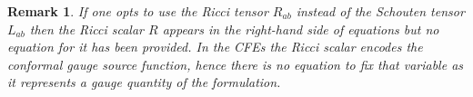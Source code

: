 \documentclass[10pt,a4paper]{article}
\theoremstyle{plain}
\newtheorem{remark}{Remark}
\begin{document}
{ \color{blue}

\begin{remark}
  \emph{ If one opts to use the Ricci tensor $R_{ab}$ instead of the Schouten tensor $L_{ab}$ then
    the Ricci scalar $R$ appears in the right-hand side of
    equations but no equation for it has been provided.
    In the CFEs the Ricci scalar encodes the \emph{conformal gauge source function}, hence
    there is no equation to fix that variable as it represents a gauge quantity of the formulation.}
\end{remark}

}
\end{document}
